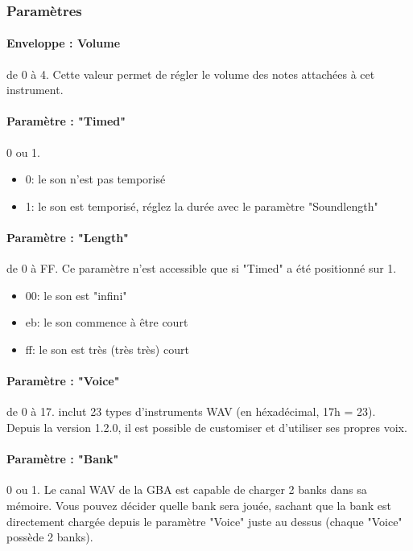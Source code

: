 
\subsubsection{Paramètres}

\paragraph{Enveloppe : Volume} de 0 à 4.
Cette valeur permet de régler le volume des notes attachées à cet instrument.

\paragraph{Paramètre : "Timed"} 0 ou 1.
\medskip

\begin{itemize}
        \item{0: le son n'est pas temporisé}
        \item{1: le son est temporisé, réglez la durée avec le paramètre "Soundlength"}
    \end{itemize}

\paragraph{Paramètre : "Length"} de 0 à FF.
Ce paramètre n'est accessible que si "Timed" a été positionné sur 1.
\medskip

\begin{itemize}
        \item{00: le son est "infini"}
        \item{eb: le son commence à être court}
        \item{ff: le son est très (très très) court}
    \end{itemize}

\paragraph{Paramètre : "Voice"} de 0 à 17.
\FAT inclut 23 types d'instruments WAV (en héxadécimal, 17h = 23).
Depuis la version 1.2.0, il est possible de customiser et d'utiliser ses propres voix.

\paragraph{Paramètre : "Bank"} 0 ou 1.
Le canal WAV de la GBA est capable de charger 2 banks dans sa mémoire.
Vous pouvez décider quelle bank sera jouée,
sachant que la bank est directement chargée depuis le paramètre "Voice" juste au dessus (chaque "Voice" possède 2 banks).


